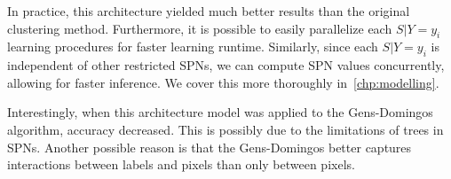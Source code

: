 In practice, this architecture yielded much better results than the original clustering method.
Furthermore, it is possible to easily parallelize each $S|Y=y_i$ learning procedures for faster
learning runtime. Similarly, since each $S|Y=y_i$ is independent of other restricted SPNs, we can
compute SPN values concurrently, allowing for faster inference. We cover this more thoroughly
in~\autoref{chp:modelling}.

Interestingly, when this architecture model was applied to the Gens-Domingos algorithm, accuracy
decreased. This is possibly due to the limitations of trees in SPNs. Another possible reason is
that the Gens-Domingos better captures interactions between labels and pixels than only between
pixels.
